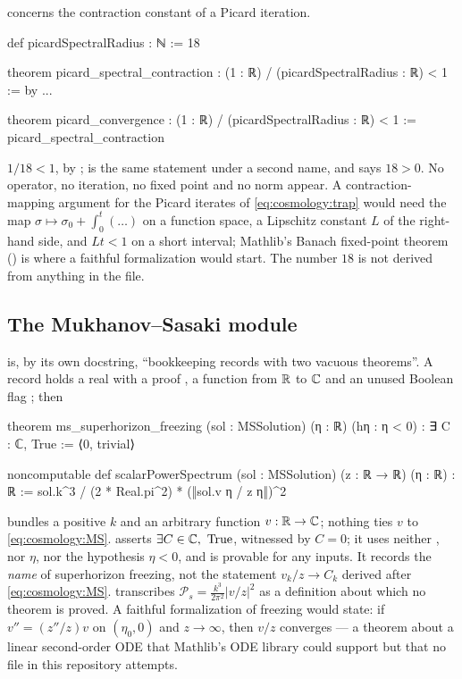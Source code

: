 concerns the contraction
constant of a Picard iteration.
\begin{leancode}
def picardSpectralRadius : ℕ := 18

theorem picard_spectral_contraction :
    (1 : ℝ) / (picardSpectralRadius : ℝ) < 1 := by ...

theorem picard_convergence :
    (1 : ℝ) / (picardSpectralRadius : ℝ) < 1 := picard_spectral_contraction
\end{leancode}
\begin{leanbox}
$1/18<1$, by ;  is the same statement under a
second name, and  says $18>0$. No operator, no iteration,
no fixed point and no norm appear. A contraction-mapping argument for the Picard iterates of
\eqref{eq:cosmology:trap} would need the map $\sigma\mapsto\sigma_0+\int_0^t(\dots)$ on a
function space, a Lipschitz constant $L$ of the right-hand side, and $Lt<1$ on a short
interval; Mathlib's Banach fixed-point theorem () is where
a faithful formalization would start. The number $18$ is not derived from anything in the
file.
\end{leanbox}

\subsection{The Mukhanov--Sasaki module}

 is, by its own
docstring, ``bookkeeping records with two vacuous theorems''. A record 
holds a real  with a proof , a function  from $\mathbb{R}$ to
$\mathbb{C}$ and an unused Boolean flag ; then
\begin{leancode}
theorem ms_superhorizon_freezing (sol : MSSolution) (η : ℝ) (hη : η < 0) :
    ∃ C : ℂ, True := ⟨0, trivial⟩

noncomputable def scalarPowerSpectrum (sol : MSSolution) (z : ℝ → ℝ)
    (η : ℝ) : ℝ :=
  sol.k^3 / (2 * Real.pi^2) * (‖sol.v η / z η‖)^2
\end{leancode}
\begin{leanbox}
 bundles a positive $k$ and an arbitrary function $v:\mathbb{R}\to\mathbb{C}$; nothing
ties $v$ to \eqref{eq:cosmology:MS}.  asserts
$\exists C\in\mathbb{C},\ \mathrm{True}$, witnessed by $C=0$; it uses neither , nor
$\eta$, nor the hypothesis $\eta<0$, and is provable for any inputs. It records the
\emph{name} of superhorizon freezing, not the statement $v_k/z\to C_k$ derived after
\eqref{eq:cosmology:MS}.  transcribes
$\mathcal P_s=\frac{k^3}{2\pi^2}|v/z|^2$ as a definition about which no theorem is proved. A
faithful formalization of freezing would state: if $v''=(z''/z)v$ on $(\eta_0,0)$ and
$z\to\infty$, then $v/z$ converges --- a theorem about a linear second-order ODE that Mathlib's
ODE library could support but that no file in this repository attempts.
\end{leanbox}

